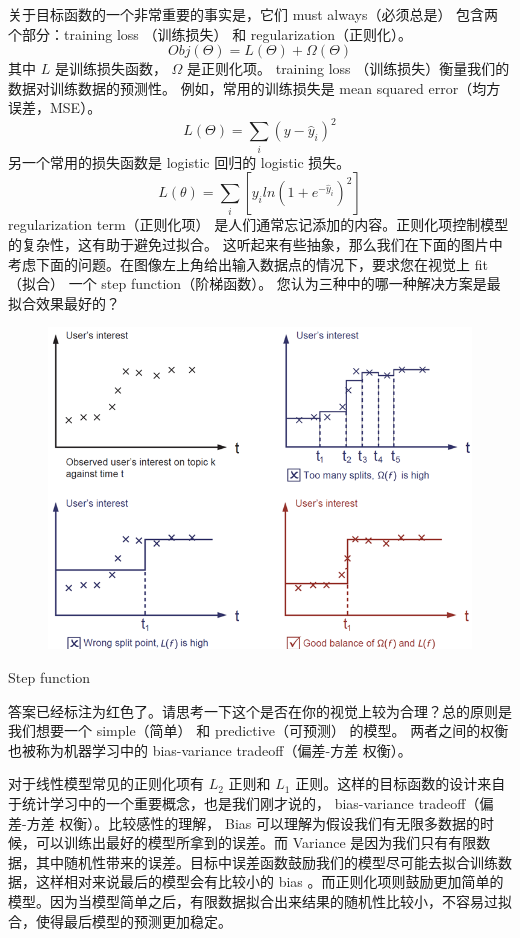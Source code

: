 \documentclass{article}
\begin{document}
关于目标函数的一个非常重要的事实是，它们 must always（必须总是） 包含两个部分：training loss （训练损失） 和 regularization（正则化）。
\[Obj(\Theta)=L(\Theta)+\Omega(\Theta)\]
其中 $L$ 是训练损失函数， $\Omega$ 是正则化项。 training loss （训练损失）衡量我们的数据对训练数据的预测性。 例如，常用的训练损失是 mean squared error（均方误差，MSE）。
\[L(\Theta)=\sum_i(y-\hat{y}_i)^2\]
另一个常用的损失函数是 logistic 回归的 logistic 损失。
\[L(\theta)=\sum_i[y_iln(1+e^{-\hat{y}_i})^2]\]
regularization term（正则化项） 是人们通常忘记添加的内容。正则化项控制模型的复杂性，这有助于避免过拟合。 这听起来有些抽象，那么我们在下面的图片中考虑下面的问题。在图像左上角给出输入数据点的情况下，要求您在视觉上 fit（拟合） 一个 step function（阶梯函数）。 您认为三种中的哪一种解决方案是最拟合效果最好的？
\begin{figure}[H]
\centering
	\includegraphics[scale=0.5]{step_fit.png}
\end{figure}
Step function

答案已经标注为红色了。请思考一下这个是否在你的视觉上较为合理？总的原则是我们想要一个 simple（简单） 和 predictive（可预测） 的模型。 两者之间的权衡也被称为机器学习中的 bias-variance tradeoff（偏差-方差 权衡）。

对于线性模型常见的正则化项有 $L_2$ 正则和 $L_1$ 正则。这样的目标函数的设计来自于统计学习中的一个重要概念，也是我们刚才说的， bias-variance tradeoff（偏差-方差 权衡）。比较感性的理解， Bias 可以理解为假设我们有无限多数据的时候，可以训练出最好的模型所拿到的误差。而 Variance 是因为我们只有有限数据，其中随机性带来的误差。目标中误差函数鼓励我们的模型尽可能去拟合训练数据，这样相对来说最后的模型会有比较小的 bias 。而正则化项则鼓励更加简单的模型。因为当模型简单之后，有限数据拟合出来结果的随机性比较小，不容易过拟合，使得最后模型的预测更加稳定。
\end{document}
